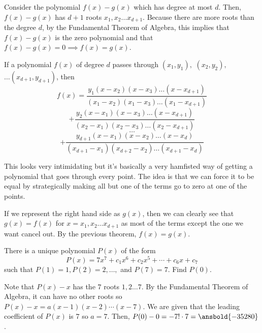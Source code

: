 \documentclass[mast]{lucky}
\begin{document}
\begin{pro}
Consider the polynomial $f(x)-g(x)$ which has degree at most $d$. Then, $f(x)-g(x)$ has $d+1$ roots $x_{1},x_{2}\ldots x_{d+1}$. Because there are more roots than the degree $d$, by the Fundamental Theorem of Algebra, this implies that $f(x)-g(x)$ is the zero polynomial and that $f(x)-g(x)=0\implies f(x)=g(x)$.
\end{pro}

\begin{theo}
If a polynomial $f(x)$ of degree $d$ passes through $(x_{1},y_{1}),$ $(x_{2},y_{2}),$ $\ldots (x_{d+1},y_{d+1})$, then
$$f(x)=\frac{y_{1}(x-x_{2})(x-x_{3})\ldots (x-x_{d+1})}{(x_{1}-x_{2})(x_{1}-x_{3})\ldots (x_{1}-x_{d+1})}$$
$$+\frac{y_{2}(x-x_{1})(x-x_{3})\ldots (x-x_{d+1})}{(x_{2}-x_{1})(x_{2}-x_{3})\ldots (x_{2}-x_{d+1})}$$
$$\ldots$$
$$+\frac{y_{d+1}(x-x_{1})(x-x_{2})\ldots (x-x_{d})}{(x_{d+1}-x_{1})(x_{d+2}-x_{2})\ldots (x_{d+1}-x_{d})}$$
\end{theo}

This looks very intimidating but it's basically a very hamfisted way of getting a polynomial that goes through every point. The idea is that we can force it to be equal by strategically making all but one of the terms go to zero at one of the points.

\begin{pro}
If we represent the right hand side as $g(x)$, then we can clearly see that $g(x)=f(x)$ for $x=x_{1},x_{2}\ldots x_{d+1}$ as most of the terms except the one we want cancel out. By the previous theorem, $f(x)=g(x)$.
\end{pro}

\begin{exam}[Mandelbrot]
There is a unique polynomial $P(x)$ of the form 
$$P(x)=7x^7+c_{1}x^6+c_{2}x^{5}+\cdots + c_{6}x+c_{7}$$
such that $P(1)=1,P(2)=2, \ldots,$ and $P(7)=7$. Find $P(0)$.
\end{exam}

\begin{sol}
Note that $P(x)-x$ has the $7$ roots $1,2\ldots 7$. By the Fundamental Theorem of Algebra, it can have no other roots so $P(x)-x=a(x-1)(x-2)\cdots(x-7)$. We are given that the leading coefficient of $P(x)$ is $7$ so $a=7$. Then, $P(0)-0=-7!\cdot 7 = \ansbold{-35280}$.
\end{sol}

\newpage

\end{document}
